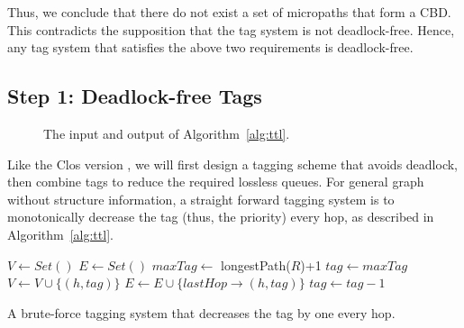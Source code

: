 Thus, we conclude that there do not exist a set of micropaths that form a CBD.
This contradicts the supposition that the tag system is not deadlock-free.
Hence, any tag system that satisfies the above two requirements is
deadlock-free.


\subsection{Step 1: Deadlock-free Tags} 

\begin{figure}[t]
	\centering
	\caption{The input and output of Algorithm~\ref{alg:ttl}.}\label{fig:three_node}
\end{figure}

Like the Clos version \sysname{}, we will first design a tagging scheme that avoids
deadlock, then combine tags to reduce the required lossless queues. 
For general graph without structure information, a straight forward tagging 
system is to monotonically decrease the tag (thus, the priority) every hop, as described in 
Algorithm~\ref{alg:ttl}. 

\begin{algorithm}
	\small
	$V \gets Set()$\;
	$E \gets Set()$\; 
	$maxTag \gets$ longestPath($R$)+1\;
	 {
		$tag \gets maxTag$\;
		 {
			$V \gets V \cup \{(h, tag)\}$\;
			$E \gets E \cup \{lastHop\rightarrow(h, tag)\}$\;
			$tag \gets tag-1$\;
		}
	}
	\;
    \caption{A brute-force tagging system that decreases the tag by one every hop.}
	\label{alg:ttl}
\end{algorithm}

